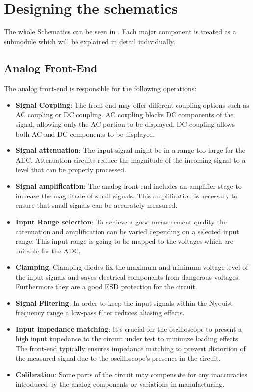 \section{Designing the schematics}

The whole Schematics can be seen in %
. Each major component is treated as a submodule which will be explained in detail individually.


\subsection{Analog Front-End}

The analog front-end is responsible for the following operations:
\begin{itemize}
	\item \textbf{Signal Coupling}: The front-end may offer different coupling options such as AC coupling or DC coupling. AC coupling blocks DC components of the signal, allowing only the AC portion to be displayed. DC coupling allows both AC and DC components to be displayed.
	\item \textbf{Signal attenuation}: The input signal might be in a range too large for the ADC. Attenuation circuits  reduce the magnitude of the incoming signal to a level that can be properly processed.
	\item \textbf{Signal amplification}: The analog front-end includes an amplifier stage to increase the magnitude of small signals. This amplification is necessary to ensure that small signals can be accurately measured.
	\item \textbf{Input Range selection}: To achieve a good measurement quality the attenuation and amplification can be varied depending on a selected input range. This input range is going to be mapped to the voltages which are suitable for the ADC.
	\item \textbf{Clamping}: Clamping diodes fix the maximum and minimum voltage level of the input signals and saves electrical components from dangerous voltages. Furthermore they are a good ESD protection for the circuit.
	\item \textbf{Signal Filtering}: In order to keep the input signals within the Nyquist frequency range a low-pass filter reduces aliasing effects.
	\item \textbf{Input impedance matching}: It's crucial for the oscilloscope to present a high input impedance to the circuit under test to minimize loading effects. The front-end typically ensures impedance matching to prevent distortion of the measured signal due to the oscilloscope's presence in the circuit.
	\item \textbf{Calibration}: Some parts of the circuit may compensate for any inaccuracies introduced by the analog components or variations in manufacturing.
\end{itemize}

